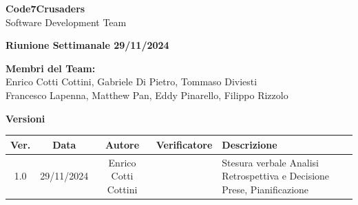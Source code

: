 \documentclass{article}
\begin{document}
\begin{titlepage}
    {\Huge \textbf{Code7Crusaders}}\\
    \vspace{0.5cm}
    {\Large Software Development Team}\\
    \vspace{2cm}
    
    {\large \textbf{Riunione Settimanale 29/11/2024}}\\ 
    \vspace{5cm}                           
    
    
    \textbf{Membri del Team:}\\
    Enrico Cotti Cottini, Gabriele Di Pietro, Tommaso Diviesti \\
    Francesco Lapenna, Matthew Pan, Eddy Pinarello, Filippo Rizzolo \\
    \vspace{0.5cm}
    
    \vspace{1cm}
\end{titlepage}



\newpage
\begin{table}[h!]
\centering
\textbf{Versioni} \\ %
\vspace{2mm} %
\begin{tabular}{|c|c|c|c|>{\raggedright\arraybackslash}p{}|}
    \hline
    \textbf{Ver.} & \textbf{Data} & \textbf{Autore} & \textbf{Verificatore} & \textbf{Descrizione} \\
    \hline
    1.0 & 29/11/2024 & Enrico Cotti Cottini &  & Stesura verbale Analisi Retrospettiva e Decisione Prese, Pianificazione \\ 
    \hline                                  
\end{tabular}
\end{table}



\newpage
\tableofcontents
\end{document}
